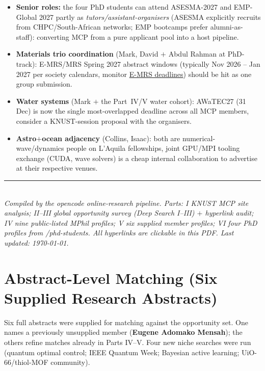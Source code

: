 \documentclass[11pt,a4paper]{article}
\begin{document}
\begin{itemize}[leftmargin=1.4em]
  \item \textbf{Senior roles:} the four PhD students can attend ASESMA-2027 and EMP-Global 2027 partly as \emph{tutors/assistant-organisers} (ASESMA explicitly recruits from CHPC/South-African networks; EMP bootcamps prefer alumni-as-staff): converting MCP from a pure applicant pool into a host pipeline.
  \item \textbf{Materials trio coordination} (Mark, David $+$ Abdul Rahman at PhD-track): E-MRS/MRS Spring 2027 abstract windows (typically Nov 2026 -- Jan 2027 per society calendars, monitor \href{https://www.european-mrs.com/meetings/deadlines}{E-MRS deadlines}) should be hit as one group submission.
  \item \textbf{Water systems} (Mark $+$ the Part~IV/V water cohort): AWaTEC27 (31 Dec) is now the single most-overlapped deadline across all MCP members, consider a KNUST-session proposal with the organisers.
  \item \textbf{Astro$+$ocean adjacency} (Collins, Isaac): both are numerical-wave/dynamics people on L'Aquila fellowships, joint GPU/MPI tooling exchange (CUDA, wave solvers) is a cheap internal collaboration to advertise at their respective venues.
\end{itemize}

\bigskip
\noindent\rule{\textwidth}{0.4pt}\\
\small\emph{Compiled by the opencode online-research pipeline. Parts: I KNUST MCP site analysis; II--III global opportunity survey (Deep Search I--III) $+$ hyperlink audit; IV nine public-listed MPhil profiles; V six supplied member profiles; VI four PhD profiles from /phd-students. All hyperlinks are clickable in this PDF. Last updated: \today.}



\newpage
\part{Abstract-Level Matching (Six Supplied Research Abstracts)}

Six full abstracts were supplied for matching against the opportunity set. One names a previously unsupplied member (\textbf{Eugene Adomako Mensah}); the others refine matches already in Parts IV--V. Four new niche searches were run (quantum optimal control; IEEE Quantum Week; Bayesian active learning; UiO-66/thiol-MOF community).
\end{document}
